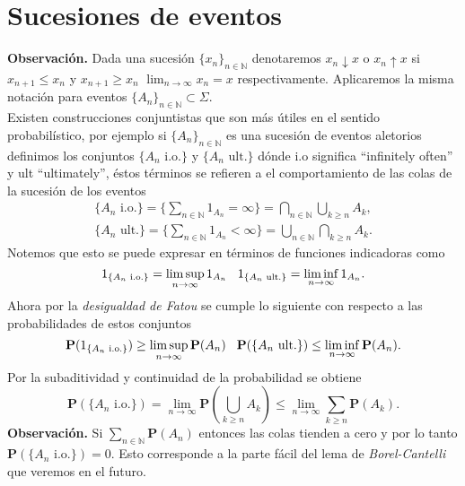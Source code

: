 \documentclass[letterpaper]{article}
\newcommand{\nat}{\ensuremath{ \mathbb N }}
\newcommand{\prob}{\textbf{P}}
\newcommand{\obs}{{\newline \noindent \sc \textbf{Observación. }}}
\newcommand{\sig}{\ensuremath{\Sigma}}
\begin{document}
\section{Sucesiones de eventos}
\label{sec:orgb798fbe}
\obs Dada una sucesión \(\{x_n\}_{n\in\nat}\) denotaremos \(x_n\downarrow x\) o \(x_n\uparrow x\) si \(x_{n+1}\leq x_n\) y \(x_{n+1}\geq x_n\) \(\lim_{n\rightarrow\infty}x_n=x\) respectivamente. Aplicaremos la misma notación para eventos \(\{A_n\}_{n\in\nat}\subset\sig\).\\
Existen construcciones conjuntistas que son más útiles en el sentido probabilístico, por ejemplo si \(\{A_n\}_{n\in\nat}\) es una sucesión de eventos aletorios definimos los conjuntos \(\{A_n\text{ i.o.}\}\) y \(\{A_n\text{ ult.}\}\) dónde i.o significa ``infinitely often'' y ult ``ultimately'', éstos términos se refieren a el comportamiento de las colas de la sucesión de los eventos
\begin{align*}
\{A_n\text{ i.o.}\}=\Big\{\sum_{n\in\nat}1_{A_n}=\infty\Big\}=\bigcap_{n\in\nat}\bigcup_{k\geq n}A_k,\\
\{A_n\text{ ult.}\}=\Big\{\sum_{n\in\nat}1_{A_n}<\infty\Big\}=\bigcup_{n\in\nat}\bigcap_{k\geq n}A_k.
\end{align*}
\noindent Notemos que esto se puede expresar en términos de funciones indicadoras como
\[
1_{\{A_n\text{ i.o.}\}}=\limsup_{n\rightarrow\infty}1_{A_n} \hspace{0.3cm} 1_{\{A_n\text{ ult.}\}}=\liminf_{n\rightarrow\infty}1_{A_n}.
\]
\noindent Ahora por la \emph{desigualdad de Fatou} se cumple lo siguiente con respecto a las probabilidades de estos conjuntos
\[
\prob(1_{\{A_n\text{ i.o.}\}})\geq\limsup_{n\rightarrow\infty}\prob(A_n)\hspace{0.3cm} \prob({\{A_n\text{ ult.}\}})\leq\liminf_{n\rightarrow\infty}\prob(A_n).
\]
\noindent Por la subaditividad y continuidad de la probabilidad se obtiene
\[
 \prob(\{A_n\text{ i.o.}\})=\lim_{n\rightarrow\infty}\prob(\bigcup_{k\geq n} A_k)\leq\lim_{n\rightarrow\infty}\sum_{k\geq n}\prob(A_k).
\]
\obs Si \(\sum_{n\in\nat}\prob(A_n)\) entonces las colas tienden a cero y por lo tanto \(\prob(\{A_n\text{ i.o.}\})=0\). Esto corresponde a la parte fácil del lema de \emph{Borel-Cantelli} que veremos en el futuro.
\end{document}
